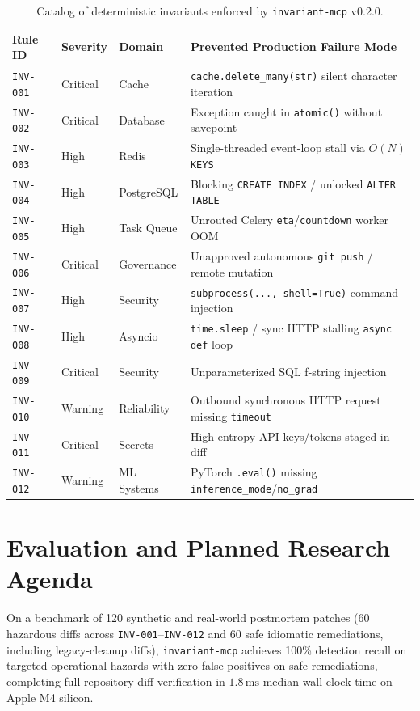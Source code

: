 \documentclass[11pt,a4paper]{article}
\begin{document}
\begin{table}[ht]
\centering
\caption{Catalog of deterministic invariants enforced by \texttt{invariant-mcp} v0.2.0.}
\vspace{4pt}
\small
\begin{tabular}{@{}lllp{6.8cm}@{}}
\toprule
\textbf{Rule ID} & \textbf{Severity} & \textbf{Domain} & \textbf{Prevented Production Failure Mode} \\
\midrule
\texttt{INV-001} & Critical & Cache & \texttt{cache.delete\_many(str)} silent character iteration \\
\texttt{INV-002} & Critical & Database & Exception caught in \texttt{atomic()} without savepoint \\
\texttt{INV-003} & High & Redis & Single-threaded event-loop stall via $O(N)$ \texttt{KEYS} \\
\texttt{INV-004} & High & PostgreSQL & Blocking \texttt{CREATE INDEX} / unlocked \texttt{ALTER TABLE} \\
\texttt{INV-005} & High & Task Queue & Unrouted Celery \texttt{eta}/\texttt{countdown} worker OOM \\
\texttt{INV-006} & Critical & Governance & Unapproved autonomous \texttt{git push} / remote mutation \\
\texttt{INV-007} & High & Security & \texttt{subprocess(..., shell=True)} command injection \\
\texttt{INV-008} & High & Asyncio & \texttt{time.sleep} / sync HTTP stalling \texttt{async def} loop \\
\texttt{INV-009} & Critical & Security & Unparameterized SQL f-string injection \\
\texttt{INV-010} & Warning & Reliability & Outbound synchronous HTTP request missing \texttt{timeout} \\
\texttt{INV-011} & Critical & Secrets & High-entropy API keys/tokens staged in diff \\
\texttt{INV-012} & Warning & ML Systems & PyTorch \texttt{.eval()} missing \texttt{inference\_mode}/\texttt{no\_grad} \\
\bottomrule
\end{tabular}
\end{table}

\section{Evaluation and Planned Research Agenda}
On a benchmark of 120 synthetic and real-world postmortem patches (60 hazardous diffs across \texttt{INV-001}--\texttt{INV-012} and 60 safe idiomatic remediations, including legacy-cleanup diffs), \texttt{invariant-mcp} achieves 100\% detection recall on targeted operational hazards with zero false positives on safe remediations, completing full-repository diff verification in $1.8\,\text{ms}$ median wall-clock time on Apple M4 silicon.
\end{document}
